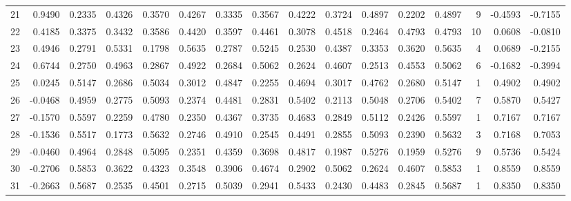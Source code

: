 \begin{tabular}{lrrrrrrrrrrrrrrr}
21  &      0.9490 &  0.2335 &  0.4326 &  0.3570 &  0.4267 &  0.3335 &  0.3567 &  0.4222 &  0.3724 &  0.4897 &   0.2202 &     0.4897 &      9 &                   -0.4593 &                    -0.7155 \\
22  &      0.4185 &  0.3375 &  0.3432 &  0.3586 &  0.4420 &  0.3597 &  0.4461 &  0.3078 &  0.4518 &  0.2464 &   0.4793 &     0.4793 &     10 &                    0.0608 &                    -0.0810 \\
23  &      0.4946 &  0.2791 &  0.5331 &  0.1798 &  0.5635 &  0.2787 &  0.5245 &  0.2530 &  0.4387 &  0.3353 &   0.3620 &     0.5635 &      4 &                    0.0689 &                    -0.2155 \\
24  &      0.6744 &  0.2750 &  0.4963 &  0.2867 &  0.4922 &  0.2684 &  0.5062 &  0.2624 &  0.4607 &  0.2513 &   0.4553 &     0.5062 &      6 &                   -0.1682 &                    -0.3994 \\
25  &      0.0245 &  0.5147 &  0.2686 &  0.5034 &  0.3012 &  0.4847 &  0.2255 &  0.4694 &  0.3017 &  0.4762 &   0.2680 &     0.5147 &      1 &                    0.4902 &                     0.4902 \\
26  &     -0.0468 &  0.4959 &  0.2775 &  0.5093 &  0.2374 &  0.4481 &  0.2831 &  0.5402 &  0.2113 &  0.5048 &   0.2706 &     0.5402 &      7 &                    0.5870 &                     0.5427 \\
27  &     -0.1570 &  0.5597 &  0.2259 &  0.4780 &  0.2350 &  0.4367 &  0.3735 &  0.4683 &  0.2849 &  0.5112 &   0.2426 &     0.5597 &      1 &                    0.7167 &                     0.7167 \\
28  &     -0.1536 &  0.5517 &  0.1773 &  0.5632 &  0.2746 &  0.4910 &  0.2545 &  0.4491 &  0.2855 &  0.5093 &   0.2390 &     0.5632 &      3 &                    0.7168 &                     0.7053 \\
29  &     -0.0460 &  0.4964 &  0.2848 &  0.5095 &  0.2351 &  0.4359 &  0.3698 &  0.4817 &  0.1987 &  0.5276 &   0.1959 &     0.5276 &      9 &                    0.5736 &                     0.5424 \\
30  &     -0.2706 &  0.5853 &  0.3622 &  0.4323 &  0.3548 &  0.3906 &  0.4674 &  0.2902 &  0.5062 &  0.2624 &   0.4607 &     0.5853 &      1 &                    0.8559 &                     0.8559 \\
31  &     -0.2663 &  0.5687 &  0.2535 &  0.4501 &  0.2715 &  0.5039 &  0.2941 &  0.5433 &  0.2430 &  0.4483 &   0.2845 &     0.5687 &      1 &                    0.8350 &                     0.8350 \\

\end{tabular}
